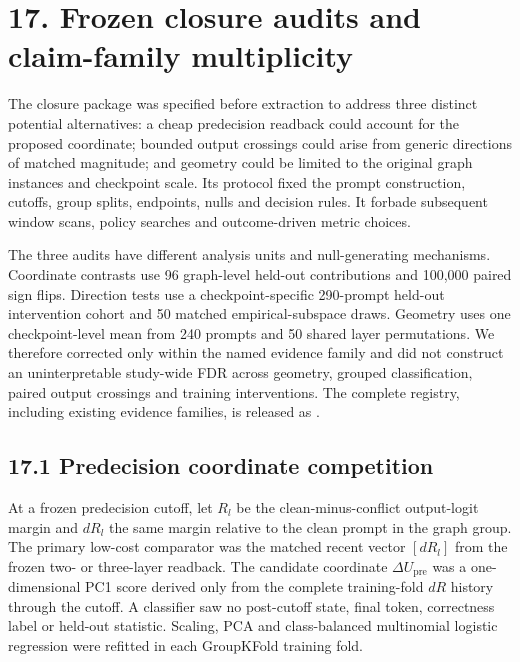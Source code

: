 \documentclass[10pt]{article}
\begin{document}
\section*{17. Frozen closure audits and claim-family multiplicity}

The closure package was specified before extraction to address three distinct potential alternatives: a cheap predecision readback could account for the proposed coordinate; bounded output crossings could arise from generic directions of matched magnitude; and geometry could be limited to the original graph instances and checkpoint scale. Its protocol fixed the prompt construction, cutoffs, group splits, endpoints, nulls and decision rules. It forbade subsequent window scans, policy searches and outcome-driven metric choices.

The three audits have different analysis units and null-generating mechanisms. Coordinate contrasts use 96 graph-level held-out contributions and 100,000 paired sign flips. Direction tests use a checkpoint-specific 290-prompt held-out intervention cohort and 50 matched empirical-subspace draws. Geometry uses one checkpoint-level mean from 240 prompts and 50 shared layer permutations. We therefore corrected only within the named evidence family and did not construct an uninterpretable study-wide FDR across geometry, grouped classification, paired output crossings and training interventions. The complete registry, including existing evidence families, is released as \texttt{}.

\subsection*{17.1 Predecision coordinate competition}

At a frozen predecision cutoff, let \(R_l\) be the clean-minus-conflict output-logit margin and \(dR_l\) the same margin relative to the clean prompt in the graph group. The primary low-cost comparator was the matched recent vector \([dR_l]\) from the frozen two- or three-layer readback. The candidate coordinate \(\Delta U_{\mathrm{pre}}\) was a one-dimensional PC1 score derived only from the complete training-fold \(dR\) history through the cutoff. A classifier saw no post-cutoff state, final token, correctness label or held-out statistic. Scaling, PCA and class-balanced multinomial logistic regression were refitted in each GroupKFold training fold.
\end{document}
